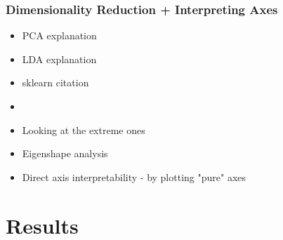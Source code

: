 \documentclass[11pt,a4paper,notitlepage]{article}
\begin{document}
\subsubsection{Dimensionality Reduction + Interpreting Axes}
\begin{itemize}
	\item PCA explanation
	\item LDA explanation
	\item sklearn citation
    \item[]
    \item Looking at the extreme ones
	\item Eigenshape analysis
	\item Direct axis interpretability - by plotting "pure" axes
\end{itemize}

\section{Results}



\end{document}
